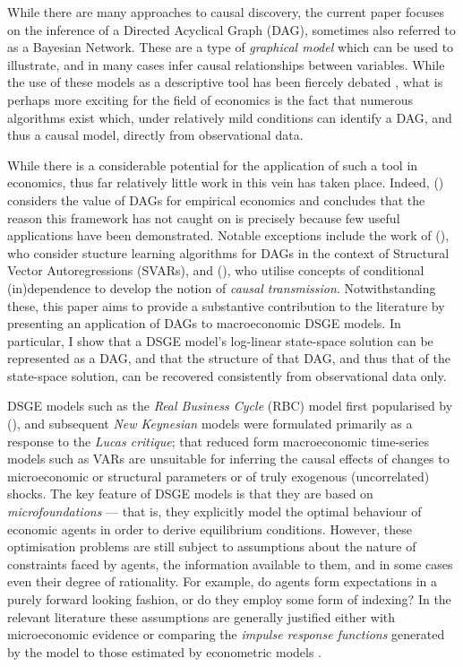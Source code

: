 \documentclass{article}
\begin{document}
While there are many approaches to causal discovery, the current paper focuses on the inference of a Directed Acyclical Graph (DAG), sometimes also referred to as a Bayesian Network. These are a type of \textit{graphical model} which can be used to illustrate, and in many cases infer causal relationships between variables. While the use of these models as a descriptive tool has been fiercely debated \parencite{pearl2018book}, what is perhaps more exciting for the field of economics is the fact that numerous algorithms exist which, under relatively mild conditions can identify a DAG, and thus a causal model, directly from observational data.

While there is a considerable potential for the application of such a tool in economics, thus far relatively little work in this vein has taken place. Indeed, \citeauthor{imbens2019potential} (\citeyear{imbens2019potential}) considers the value of DAGs for empirical economics and concludes that the reason this framework has not caught on is precisely because few useful applications have been demonstrated. Notable exceptions include the work of \citeauthor{demiralp2003searching} (\citeyear{demiralp2003searching}), who consider stucture learning algorithms for DAGs in the context of Structural Vector Autoregressions (SVARs), and \citeauthor{bazinas2015causal} (\citeyear{bazinas2015causal}), who utilise concepts of conditional (in)dependence to develop the notion of \textit{causal transmission}. Notwithstanding these, this paper aims to provide a substantive contribution to the literature by presenting an application of DAGs to macroeconomic DSGE models. In particular, I show that a DSGE model's log-linear state-space solution can be represented as a DAG, and that the structure of that DAG, and thus that of the state-space solution, can be recovered consistently from observational data only. 

DSGE models such as the \textit{Real Business Cycle} (RBC) model first popularised by \citeauthor{kydland1982time} (\citeyear{kydland1982time}), and subsequent \textit{New Keynesian} models were formulated primarily as a response to the \textit{Lucas critique}; that reduced form macroeconomic time-series models such as VARs are unsuitable for inferring the causal effects of changes to microeconomic or structural parameters or of truly exogenous (uncorrelated) shocks. The key feature of DSGE models is that they are based on \textit{microfoundations} --- that is, they explicitly model the optimal behaviour of economic agents in order to derive equilibrium conditions. However, these optimisation problems are still subject to assumptions about the nature of constraints faced by agents, the information available to them, and in some cases even their degree of rationality. For example, do agents form expectations in a purely forward looking fashion, or do they employ some form of indexing? In the relevant literature these assumptions are generally justified either with microeconomic evidence or comparing the \textit{impulse response functions} generated by the model to those estimated by econometric models \parencite{christiano2018on}. 
\end{document}
